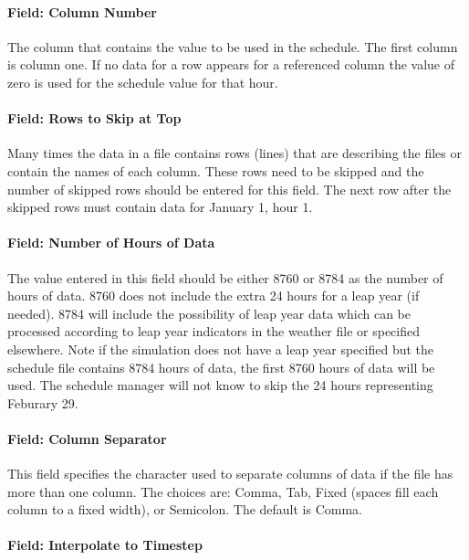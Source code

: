 \paragraph{Field: Column Number}\label{field-column-number}

The column that contains the value to be used in the schedule. The first column is column one. If no data for a row appears for a referenced column the value of zero is used for the schedule value for that hour.

\paragraph{Field: Rows to Skip at Top}\label{field-rows-to-skip-at-top}

Many times the data in a file contains rows (lines) that are describing the files or contain the names of each column. These rows need to be skipped and the number of skipped rows should be entered for this field. The next row after the skipped rows must contain data for January 1, hour 1.

\paragraph{Field: Number of Hours of Data}\label{field-number-of-hours-of-data}

The value entered in this field should be either 8760 or 8784 as the number of hours of data. 8760 does not include the extra 24 hours for a leap year (if needed). 8784 will include the possibility of leap year data which can be processed according to leap year indicators in the weather file or specified elsewhere. Note if the simulation does not have a leap year specified but the schedule file contains 8784 hours of data, the first 8760 hours of data will be used. The schedule manager will not know to skip the 24 hours representing Feburary 29.

\paragraph{Field: Column Separator}\label{field-column-separator-001}

This field specifies the character used to separate columns of data if the file has more than one column. The choices are: Comma, Tab, Fixed (spaces fill each column to a fixed width), or Semicolon. The default is Comma.

\paragraph{Field: Interpolate to Timestep}\label{field-interpolate-to-timestep-2}

